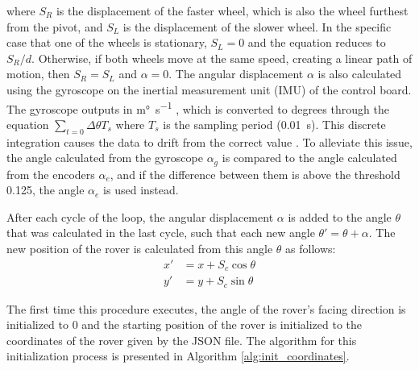\documentclass{article}
\begin{document}
          where $S_R$ is the displacement of the faster wheel, which is also the wheel furthest from the pivot, and $S_L$ is the displacement of the slower wheel. In the specific case that one of the wheels is stationary, $S_L=0$ and the equation reduces to $S_R/d$. Otherwise, if both wheels move at the same speed, creating a linear path of motion, then $S_R=S_L$ and $\alpha=0$. The angular displacement $\alpha$ is also calculated using the gyroscope on the inertial measurement unit (IMU) of the control board. The gyroscope outputs in \si{\milli\degree\per\s} \cite{LSM6DS33}, which is converted to degrees through the equation $\sum_{t=0}\Delta\theta T_s$ where $T_s$ is the sampling period (\SI{0.01}{\s}). This discrete integration causes the data to drift from the correct value \cite{NovAtzl}. To alleviate this issue, the angle calculated from the gyroscope $\alpha_g$ is compared to the angle calculated from the encoders $\alpha_e$, and if the difference between them is above the threshold 0.125, the angle $\alpha_e$ is used instead.
          \par After each cycle of the loop, the angular displacement $\alpha$ is added to the angle $\theta$ that was calculated in the last cycle, such that each new angle $\theta' = \theta+\alpha$. The new position of the rover is calculated from this angle $\theta$ as follows:
          \begin{align}
               x'&=x+S_c\cos\theta\\
               y'&=y+S_c\sin\theta
          \end{align}
          \par The first time this procedure executes, the angle of the rover's facing direction is initialized to 0 and the starting position of the rover is initialized to the coordinates of the rover given by the JSON file. The algorithm for this initialization process is presented in Algorithm \ref{alg:init_coordinates}.
\end{document}
